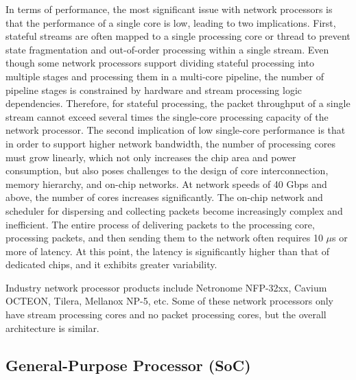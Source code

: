 In terms of performance, the most significant issue with network processors is that the performance of a single core is low, leading to two implications.
First, stateful streams are often mapped to a single processing core or thread to prevent state fragmentation and out-of-order processing within a single stream. Even though some network processors support dividing stateful processing into multiple stages and processing them in a multi-core pipeline, the number of pipeline stages is constrained by hardware and stream processing logic dependencies.
Therefore, for stateful processing, the packet throughput of a single stream cannot exceed several times the single-core processing capacity of the network processor.
The second implication of low single-core performance is that in order to support higher network bandwidth, the number of processing cores must grow linearly, which not only increases the chip area and power consumption, but also poses challenges to the design of core interconnection, memory hierarchy, and on-chip networks.
At network speeds of 40 Gbps and above, the number of cores increases significantly. The on-chip network and scheduler for dispersing and collecting packets become increasingly complex and inefficient. The entire process of delivering packets to the processing core, processing packets, and then sending them to the network often requires 10 $\mu$s or more of latency.
At this point, the latency is significantly higher than that of dedicated chips, and it exhibits greater variability.

Industry network processor products include Netronome NFP-32xx, Cavium OCTEON, Tilera, Mellanox NP-5, etc. Some of these network processors only have stream processing cores and no packet processing cores, but the overall architecture is similar.

\subsection{General-Purpose Processor (SoC)}
\label{smartnic-soc}

